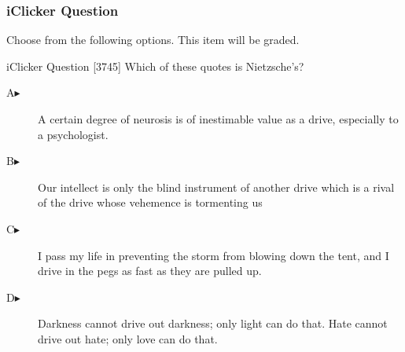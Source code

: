 \begin{frame}
  \frametitle{iClicker Question}
Choose from the following options. This item will be graded.
\begin{block}{iClicker Question}
[3745] Which of these quotes is Nietzsche's?
\end{block}
\begin{description}
\item[A\hspace{.2in}$\blacktriangleright$] A certain degree of neurosis is of inestimable value as a drive, especially to a psychologist.
\item[B\hspace{.2in}$\blacktriangleright$] Our intellect is only the blind instrument of another drive which is a rival of the drive whose vehemence is tormenting us
\item[C\hspace{.2in}$\blacktriangleright$] I pass my life in preventing the storm from blowing down the tent, and I drive in the pegs as fast as they are pulled up.
\item[D\hspace{.2in}$\blacktriangleright$] Darkness cannot drive out darkness; only light can do that. Hate cannot drive out hate; only love can do that.
\end{description}
\end{frame}